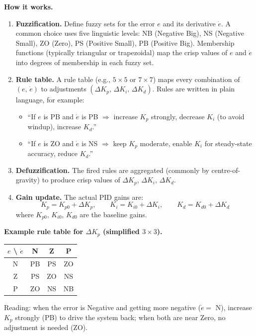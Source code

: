 \textbf{How it works.}
\begin{enumerate}
    \item \textbf{Fuzzification.} Define fuzzy sets for the error $e$ and its derivative $\dot{e}$. A common choice uses five linguistic levels: NB (Negative Big), NS (Negative Small), ZO (Zero), PS (Positive Small), PB (Positive Big). Membership functions (typically triangular or trapezoidal) map the crisp values of $e$ and $\dot{e}$ into degrees of membership in each fuzzy set.
    \item \textbf{Rule table.} A rule table (e.g., $5 \times 5$ or $7 \times 7$) maps every combination of $(e,\, \dot{e})$ to adjustments $(\Delta K_p,\, \Delta K_i,\, \Delta K_d)$. Rules are written in plain language, for example:
    \begin{itemize}
        \item ``If $e$ is PB and $\dot{e}$ is PB $\Rightarrow$ increase $K_p$ strongly, decrease $K_i$ (to avoid windup), increase $K_d$.''
        \item ``If $e$ is ZO and $\dot{e}$ is NS $\Rightarrow$ keep $K_p$ moderate, enable $K_i$ for steady-state accuracy, reduce $K_d$.''
    \end{itemize}
    \item \textbf{Defuzzification.} The fired rules are aggregated (commonly by centre-of-gravity) to produce crisp values of $\Delta K_p$, $\Delta K_i$, $\Delta K_d$.
    \item \textbf{Gain update.} The actual PID gains are:
    \[
        K_p = K_{p0} + \Delta K_p, \qquad K_i = K_{i0} + \Delta K_i, \qquad K_d = K_{d0} + \Delta K_d
    \]
    where $K_{p0}$, $K_{i0}$, $K_{d0}$ are the baseline gains.
\end{enumerate}

\textbf{Example rule table for $\Delta K_p$ (simplified $3 \times 3$).}
\begin{center}
\begin{tabular}{c|ccc}
    $e$ \textbackslash{} $\dot{e}$ & N & Z & P \\
    \hline
    N & PB & PS & ZO \\
    Z & PS & ZO & NS \\
    P & ZO & NS & NB \\
\end{tabular}
\end{center}
Reading: when the error is Negative and getting more negative ($\dot{e} = $ N), increase $K_p$ strongly (PB) to drive the system back; when both are near Zero, no adjustment is needed (ZO).

